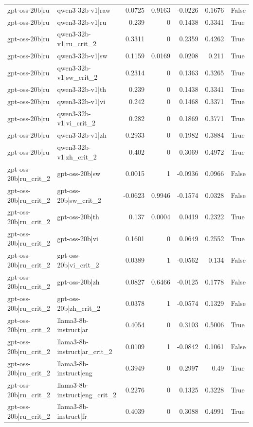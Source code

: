 \begin{table}
\begin{tabular}{l l r r r r l}
gpt-oss-20b|ru & qwen3-32b-v1|raw & 0.0725 & 0.9163 & -0.0226 & 0.1676 & False \\
gpt-oss-20b|ru & qwen3-32b-v1|ru & 0.239 & 0 & 0.1438 & 0.3341 & True \\
gpt-oss-20b|ru & qwen3-32b-v1|ru_crit_2 & 0.3311 & 0 & 0.2359 & 0.4262 & True \\
gpt-oss-20b|ru & qwen3-32b-v1|sw & 0.1159 & 0.0169 & 0.0208 & 0.211 & True \\
gpt-oss-20b|ru & qwen3-32b-v1|sw_crit_2 & 0.2314 & 0 & 0.1363 & 0.3265 & True \\
gpt-oss-20b|ru & qwen3-32b-v1|th & 0.239 & 0 & 0.1438 & 0.3341 & True \\
gpt-oss-20b|ru & qwen3-32b-v1|vi & 0.242 & 0 & 0.1468 & 0.3371 & True \\
gpt-oss-20b|ru & qwen3-32b-v1|vi_crit_2 & 0.282 & 0 & 0.1869 & 0.3771 & True \\
gpt-oss-20b|ru & qwen3-32b-v1|zh & 0.2933 & 0 & 0.1982 & 0.3884 & True \\
gpt-oss-20b|ru & qwen3-32b-v1|zh_crit_2 & 0.402 & 0 & 0.3069 & 0.4972 & True \\
gpt-oss-20b|ru_crit_2 & gpt-oss-20b|sw & 0.0015 & 1 & -0.0936 & 0.0966 & False \\
gpt-oss-20b|ru_crit_2 & gpt-oss-20b|sw_crit_2 & -0.0623 & 0.9946 & -0.1574 & 0.0328 & False \\
gpt-oss-20b|ru_crit_2 & gpt-oss-20b|th & 0.137 & 0.0004 & 0.0419 & 0.2322 & True \\
gpt-oss-20b|ru_crit_2 & gpt-oss-20b|vi & 0.1601 & 0 & 0.0649 & 0.2552 & True \\
gpt-oss-20b|ru_crit_2 & gpt-oss-20b|vi_crit_2 & 0.0389 & 1 & -0.0562 & 0.134 & False \\
gpt-oss-20b|ru_crit_2 & gpt-oss-20b|zh & 0.0827 & 0.6466 & -0.0125 & 0.1778 & False \\
gpt-oss-20b|ru_crit_2 & gpt-oss-20b|zh_crit_2 & 0.0378 & 1 & -0.0574 & 0.1329 & False \\
gpt-oss-20b|ru_crit_2 & llama3-8b-instruct|ar & 0.4054 & 0 & 0.3103 & 0.5006 & True \\
gpt-oss-20b|ru_crit_2 & llama3-8b-instruct|ar_crit_2 & 0.0109 & 1 & -0.0842 & 0.1061 & False \\
gpt-oss-20b|ru_crit_2 & llama3-8b-instruct|eng & 0.3949 & 0 & 0.2997 & 0.49 & True \\
gpt-oss-20b|ru_crit_2 & llama3-8b-instruct|eng_crit_2 & 0.2276 & 0 & 0.1325 & 0.3228 & True \\
gpt-oss-20b|ru_crit_2 & llama3-8b-instruct|fr & 0.4039 & 0 & 0.3088 & 0.4991 & True \\

\end{tabular}
\end{table}
